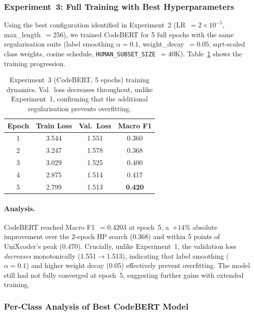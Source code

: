 \documentclass[11pt]{article}
\begin{document}
\subsubsection{Experiment~3: Full Training with Best Hyperparameters}
\label{sec:taskB_exp3}

Using the best configuration identified in Experiment~2 (LR~$= 2{\times}10^{-5}$, max\_length~$= 256$), we trained CodeBERT for 5 full epochs with the same regularisation suite (label smoothing $\alpha = 0.1$, weight\_decay~$= 0.05$, sqrt-scaled class weights, cosine schedule, \texttt{HUMAN\_SUBSET\_SIZE}~$= 40\text{K}$).
Table~\ref{tab:taskB_exp3_progress} shows the training progression.

\begin{table}[htbp]
\centering
\footnotesize
\begin{tabularx}{\columnwidth}{@{}c c c c@{}}
\toprule
\textbf{Epoch} & \textbf{Train Loss} & \textbf{Val.\ Loss} & \textbf{Macro F1} \\ \midrule
1 & 3.544 & 1.551 & 0.360 \\
2 & 3.247 & 1.578 & 0.368 \\
3 & 3.029 & 1.525 & 0.400 \\
4 & 2.875 & 1.514 & 0.417 \\
5 & 2.799 & 1.513 & \textbf{0.420} \\
\bottomrule
\end{tabularx}
\caption{Experiment~3 (CodeBERT, 5 epochs) training dynamics. Val.\ loss decreases throughout, unlike Experiment~1, confirming that the additional regularisation prevents overfitting.}
\label{tab:taskB_exp3_progress}
\end{table}

\paragraph{Analysis.}
CodeBERT reached Macro F1~$= \mathbf{0.4203}$ at epoch~5, a~$+14\%$ absolute improvement over the 2-epoch HP search (0.368) and within 5 points of UniXcoder's peak (0.470). Crucially, unlike Experiment~1, the validation loss \emph{decreases} monotonically (1.551$\to$1.513), indicating that label smoothing ($\alpha=0.1$) and higher weight decay (0.05) effectively prevent overfitting. The model still had not fully converged at epoch~5, suggesting further gains with extended training.

\subsubsection{Per-Class Analysis of Best CodeBERT Model}
\label{sec:taskB_perclass}
\end{document}
